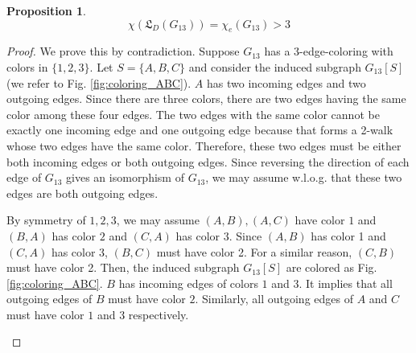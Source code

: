 \documentclass[journal, onecolumn, draftcls]{IEEEtran}
\theoremstyle{definition}
\newtheorem{proposition}{Proposition}
\newcommand{\frL}{\mathfrak{L}}
\newcommand{\aditya}[1]{\marginpar{+}{\bf Aditya's remark}: {\em #1}}
\begin{document}
\begin{proposition}
    $$
 \chi(\frL_D(G_{13}))= \chi_e(G_{13}) >3
    $$
\end{proposition}
\begin{proof}
We prove this by contradiction.  Suppose $G_{13}$ has a 3-edge-coloring with colors in $\{1,2,3\}$. Let $S=\{A,B,C\}$ and consider the induced subgraph $G_{13}[S]$ (we refer to Fig. \ref{fig:coloring_ABC}).  $A$ has two incoming edges and two outgoing edges. Since there are three colors, there are two edges having the same color among these four edges. The two edges with the same color cannot be exactly one incoming edge and one outgoing edge because that forms a 2-walk whose two edges have the same color. Therefore, these  two edges must be either both incoming edges or both outgoing edges. Since reversing the direction of each edge of $G_{13}$ gives an isomorphism of $G_{13}$, we may assume w.l.o.g. that these two edges are both outgoing edges.   

By symmetry of $1,2,3$, we may assume $(A,B),(A,C)$ have color $1$ and $(B,A)$ has color $2$ and $(C,A)$ has color $3$. Since $(A,B)$ has color 1 and $(C,A)$ has color 3, $(B,C)$ must have color 2. For a similar reason, $(C,B)$ must have color 2. Then, the induced subgraph $G_{13}[S]$ are colored as Fig. \ref{fig:coloring_ABC}.  $B$ has incoming edges of colors $1$ and $3$. It implies that all outgoing edges of $B$ must have color $2$. Similarly,
all outgoing edges of $A$ and $C$ must have color $1$ and $3$ respectively. 
\begin{figure}[t]
    \centering
\end{figure}
\end{proof}
\end{document}
